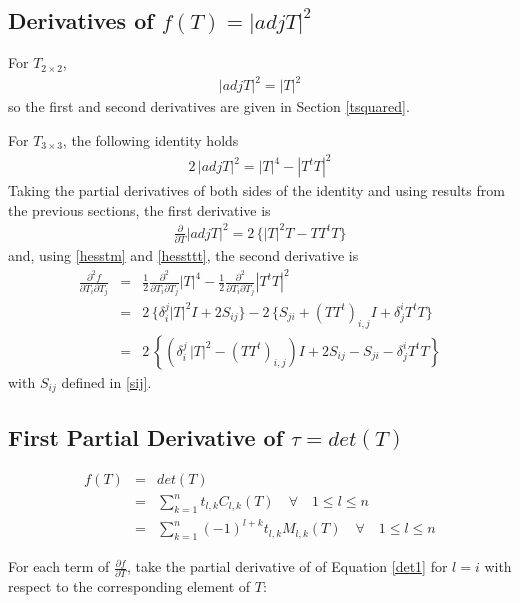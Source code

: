 \documentclass{report}
\begin{document}
\subsection{Derivatives of $f(T)=|adj T|^2$ \label{nrm-adj}}
For $T_{2 \times 2}$, 
\begin{eqnarray}
|adj T|^2 = |T|^2 
\end{eqnarray}
so the first and second derivatives are given in Section \ref{tsquared}. \newline

\noindent For $T_{3 \times 3}$, the following identity holds
\begin{eqnarray}
2 \, |adj T|^2 = |T|^4 - |T^t T|^2
\end{eqnarray}
Taking the partial derivatives of both sides of the identity and using results 
from the previous sections, the first derivative is
\begin{eqnarray}
\frac{\partial}{\partial T} |adj T|^2 = 2 \, \{ |T|^2 T - T T^t T \}
\end{eqnarray}
and, using \ref{hesstm} and \ref{hessttt}, the second derivative is
\begin{eqnarray}
\frac{\partial^2 f}{\partial T_i \partial T_j} & = & \frac{1}{2} \frac{\partial^2 }{\partial T_i \partial T_j} |T|^4 - \frac{1}{2} \frac{\partial^2}{\partial T_i \partial T_j} |T^t T|^2 \nonumber \\
 & = & 2 \, \{ \delta_i^j |T|^2 I + 2 S_{ij} \} - 2 \, \{ S_{ji} + (T T^t)_{i,j} I + \delta_j^i T^t T \} \nonumber \\
 & = & 2 \, \left\{ \left( \delta_i^j \, |T|^2 - (T T^t)_{i,j} \right) I + 2 S_{ij}-S_{ji} - \delta_j^i T^t T \right\} \label{hess-nrm-adj}
\end{eqnarray}
with $S_{ij}$ defined in \ref{sij}. \newline

\subsection{First Partial Derivative of $\tau=det(T)$}

\begin{eqnarray}
f(T) &=& det(T) \\
     &=& \sum_{k=1}^n t_{l,k} C_{l,k}(T) \quad \forall \quad 1 \le l \le n \\
\label{det1}
     &=& \sum_{k=1}^n (-1)^{l+k} t_{l,k} M_{l,k}(T) \quad \forall \quad 1 \le l \le n
\end{eqnarray}

\noindent For each term of $\frac{\partial f}{\partial T}$, take the partial derivative of of Equation \ref{det1} for $l = i$ with respect to the corresponding element of $T$:
\end{document}
